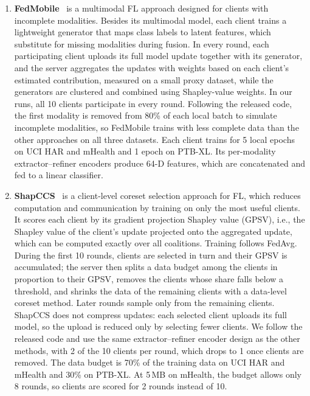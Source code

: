 \documentclass[sigconf]{acmart}
\begin{document}
\begin{enumerate}

    \item \textbf{FedMobile}~\cite{liu2025fedmobile}
  is a multimodal FL approach designed for clients with incomplete modalities.
  Besides its multimodal model, each client trains a lightweight generator
  that maps class labels to latent features, which substitute for missing
  modalities during fusion. In every round, each participating client uploads
  its full model update together with its generator, and the server
  aggregates the updates with weights based on each client's estimated
  contribution, measured on a small proxy dataset, while the generators are
  clustered and combined using Shapley-value weights.
  In our runs, all 10 clients participate in every round. Following the
  released code, the first modality is removed from 80\% of each local batch to
  simulate incomplete modalities, so FedMobile trains with less complete data
  than the other approaches on all three datasets. Each client trains for 5
  local epochs on UCI HAR and mHealth and 1 epoch on PTB-XL. Its per-modality
  extractor--refiner encoders produce 64-D features, which are concatenated
  and fed to a linear classifier.

  \item \textbf{ShapCCS}~\cite{ji2026shapccs}
  is a client-level coreset selection approach for FL, which reduces
  computation and communication by training on only the most useful clients.
  It scores each client by its gradient projection Shapley value (GPSV), i.e.,
  the Shapley value of the client's update projected onto the aggregated
  update, which can be computed exactly over all coalitions. Training follows
  FedAvg. During the first 10 rounds, clients are selected in turn and their
  GPSV is accumulated; the server then splits a data budget among the clients
  in proportion to their GPSV, removes the clients whose share falls below a
  threshold, and shrinks the data of the remaining clients with a data-level
  coreset method. Later rounds sample only from the remaining clients. ShapCCS
  does not compress updates: each selected client uploads its full model, so
  the upload is reduced only by selecting fewer clients. We follow the released
  code and use the same extractor--refiner encoder design as the other methods, with
  2 of the 10 clients per round, which drops to 1 once clients are removed. The
  data budget is 70\% of the training data on UCI HAR and mHealth and 30\% on
  PTB-XL. At 5\,MB on mHealth, the budget allows only 8 rounds, so clients are
  scored for 2 rounds instead of 10.
\end{enumerate}
\end{document}
